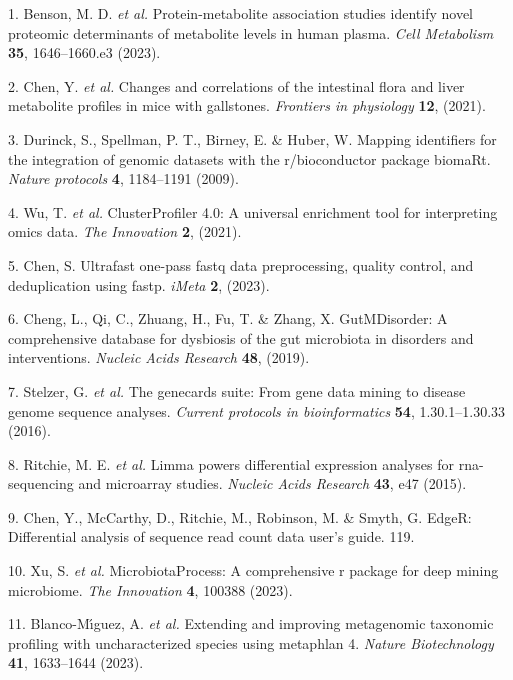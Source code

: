 \documentclass[
]{article}
\newenvironment{cslreferences}%
  {}%
  {\par}
\begin{document}
\hypertarget{refs}{}
\begin{cslreferences}
\leavevmode\hypertarget{ref-ProteinMetabolBenson2023}{}%
1. Benson, M. D. \emph{et al.} Protein-metabolite association studies identify novel proteomic determinants of metabolite levels in human plasma. \emph{Cell Metabolism} \textbf{35}, 1646--1660.e3 (2023).

\leavevmode\hypertarget{ref-ChangesAndCorChen2021}{}%
2. Chen, Y. \emph{et al.} Changes and correlations of the intestinal flora and liver metabolite profiles in mice with gallstones. \emph{Frontiers in physiology} \textbf{12}, (2021).

\leavevmode\hypertarget{ref-MappingIdentifDurinc2009}{}%
3. Durinck, S., Spellman, P. T., Birney, E. \& Huber, W. Mapping identifiers for the integration of genomic datasets with the r/bioconductor package biomaRt. \emph{Nature protocols} \textbf{4}, 1184--1191 (2009).

\leavevmode\hypertarget{ref-ClusterprofilerWuTi2021}{}%
4. Wu, T. \emph{et al.} ClusterProfiler 4.0: A universal enrichment tool for interpreting omics data. \emph{The Innovation} \textbf{2}, (2021).

\leavevmode\hypertarget{ref-UltrafastOnePChen2023}{}%
5. Chen, S. Ultrafast one-pass fastq data preprocessing, quality control, and deduplication using fastp. \emph{iMeta} \textbf{2}, (2023).

\leavevmode\hypertarget{ref-GutmdisorderACheng2019}{}%
6. Cheng, L., Qi, C., Zhuang, H., Fu, T. \& Zhang, X. GutMDisorder: A comprehensive database for dysbiosis of the gut microbiota in disorders and interventions. \emph{Nucleic Acids Research} \textbf{48}, (2019).

\leavevmode\hypertarget{ref-TheGenecardsSStelze2016}{}%
7. Stelzer, G. \emph{et al.} The genecards suite: From gene data mining to disease genome sequence analyses. \emph{Current protocols in bioinformatics} \textbf{54}, 1.30.1--1.30.33 (2016).

\leavevmode\hypertarget{ref-LimmaPowersDiRitchi2015}{}%
8. Ritchie, M. E. \emph{et al.} Limma powers differential expression analyses for rna-sequencing and microarray studies. \emph{Nucleic Acids Research} \textbf{43}, e47 (2015).

\leavevmode\hypertarget{ref-EdgerDifferenChen}{}%
9. Chen, Y., McCarthy, D., Ritchie, M., Robinson, M. \& Smyth, G. EdgeR: Differential analysis of sequence read count data user's guide. 119.

\leavevmode\hypertarget{ref-MicrobiotaproceXuSh2023}{}%
10. Xu, S. \emph{et al.} MicrobiotaProcess: A comprehensive r package for deep mining microbiome. \emph{The Innovation} \textbf{4}, 100388 (2023).

\leavevmode\hypertarget{ref-ExtendingAndIBlanco2023}{}%
11. Blanco-Mı́guez, A. \emph{et al.} Extending and improving metagenomic taxonomic profiling with uncharacterized species using metaphlan 4. \emph{Nature Biotechnology} \textbf{41}, 1633--1644 (2023).
\end{cslreferences}
\end{document}
